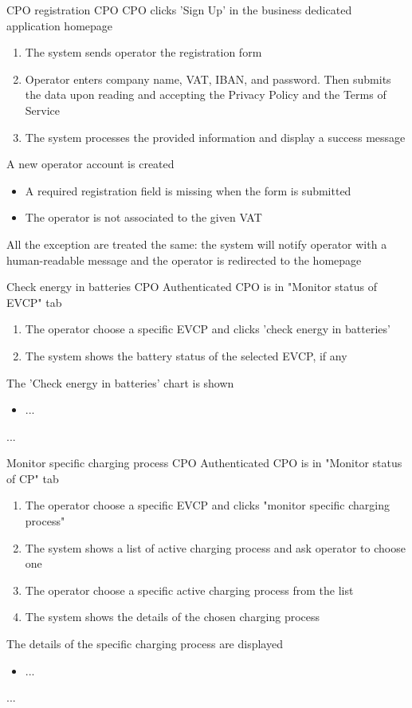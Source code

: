 \usecase
{CPO registration} %
{CPO} %
{CPO clicks 'Sign Up' in the business dedicated application homepage} %
{ %
    \begin{enumerate}
        \item The system sends operator the registration form
        \item Operator enters company name, VAT, IBAN, and password. Then submits the data upon reading and accepting the Privacy Policy and the Terms of Service
        \item The system processes the provided information and display a success message
    \end{enumerate}
}
{A new operator account is created} %
{ %
    \begin{itemize}
        \item A required registration field is missing when the form is submitted
        \item The operator is not associated to the given VAT
    \end{itemize}
}
{ %
    All the exception are treated the same: the system will notify operator with a human-readable message and the operator is redirected to the homepage
}

\usecase
{Check energy in batteries} %
{CPO} %
{Authenticated CPO is in "Monitor status of EVCP" tab} %
{ %
    \begin{enumerate}
        \item The operator choose a specific EVCP and clicks 'check energy in batteries'
        \item The system shows the battery status of the selected EVCP, if any
    \end{enumerate}
}
{The 'Check energy in batteries' chart is shown} %
{ %
    \begin{itemize}
        \item ...
    \end{itemize}
}
{ %
    ...
}

\usecase
{Monitor specific charging process} %
{CPO} %
{Authenticated CPO is in "Monitor status of CP" tab} %
{ %
    \begin{enumerate}
        \item The operator choose a specific EVCP and clicks "monitor specific charging process"
        \item The system shows a list of active charging process and ask operator to choose one
        \item The operator choose a specific active charging process from the list
        \item The system shows the details of the chosen charging process
    \end{enumerate}
}
{The details of the specific charging process are displayed} %
{ %
    \begin{itemize}
        \item ...
    \end{itemize}
}
{ %
...
}

